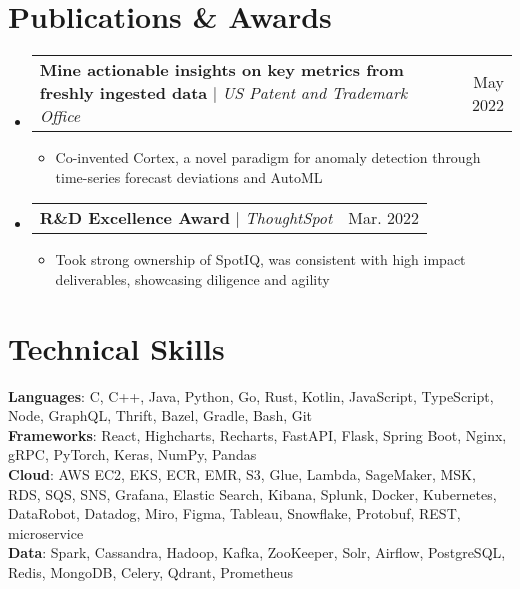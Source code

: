 \documentclass[letterpaper,11pt]{article}
\makeatletter
\newcommand{\resumeItem}[1]{
  \item\small{
    {#1 \vspace{-2pt}}
  }
}
\newcommand{\resumeProjectHeading}[2]{
    \item
    \begin{tabular*}{0.97\textwidth}{l@{\extracolsep{\fill}}r}
      \small#1 & #2 \\
    \end{tabular*}\vspace{-7pt}
}
\newcommand{\resumeSubHeadingListStart}{\begin{itemize}[leftmargin=0.15in, label={}]}
\newcommand{\resumeSubHeadingListEnd}{\end{itemize}}
\newcommand{\resumeItemListStart}{\begin{itemize}}
\newcommand{\resumeItemListEnd}{\end{itemize}\vspace{-6pt}}
\makeatother
\begin{document}
%
\section{Publications \& Awards}
    \resumeSubHeadingListStart
      \resumeProjectHeading
          {\textbf{Mine actionable insights on key metrics from freshly ingested data} $|$ \emph{US Patent and Trademark Office}}{May 2022}
          \resumeItemListStart
            \resumeItem{Co-invented Cortex, a novel paradigm for anomaly detection through time-series forecast deviations and AutoML}
          \resumeItemListEnd
      \resumeProjectHeading
          {\textbf{R\&D Excellence Award} $|$ \emph{ThoughtSpot}}{Mar. 2022}
          \resumeItemListStart
            \resumeItem{Took strong ownership of SpotIQ, was consistent with high impact deliverables, showcasing diligence and agility}
          \resumeItemListEnd
    \resumeSubHeadingListEnd

    
%
\section{Technical Skills}
 \begin{itemize}[leftmargin=0.1in, label={}]
    \small{\item{
     \textbf{Languages}{: C, C++, Java, Python, Go, Rust, Kotlin, JavaScript, TypeScript, Node, GraphQL, Thrift, Bazel, Gradle, Bash, Git} \\
     \textbf{Frameworks}{: React, Highcharts, Recharts, FastAPI, Flask, Spring Boot, Nginx, gRPC, PyTorch, Keras, NumPy, Pandas} \\
     \textbf{Cloud}{: AWS EC2, EKS, ECR, EMR, S3, Glue, Lambda, SageMaker, MSK, RDS, SQS, SNS, Grafana, Elastic Search, Kibana, Splunk, Docker, Kubernetes, DataRobot, Datadog, Miro, Figma, Tableau, Snowflake, Protobuf, REST, microservice} \\
     \textbf{Data}{: Spark, Cassandra, Hadoop, Kafka, ZooKeeper, Solr, Airflow, PostgreSQL, Redis, MongoDB, Celery, Qdrant, Prometheus}
    }}
 \end{itemize}



\end{document}
